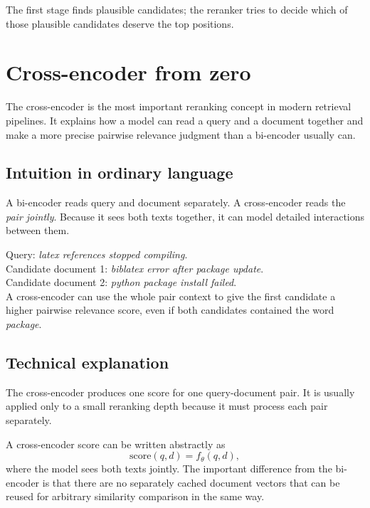 \documentclass[11pt,oneside]{report}
\begin{document}
\begin{rememberbox}
The first stage finds plausible candidates; the reranker tries to decide which of those plausible candidates deserve the top positions.
\end{rememberbox}


\chapter[Cross-Encoder]{Cross-encoder from zero}

\begin{purposebox}
The cross-encoder is the most important reranking concept in modern retrieval pipelines. It explains how a model can read a query and a document together and make a more precise pairwise relevance judgment than a bi-encoder usually can.
\end{purposebox}

\section*{Intuition in ordinary language}
A bi-encoder reads query and document separately. A cross-encoder reads the \emph{pair jointly}. Because it sees both texts together, it can model detailed interactions between them.

\begin{examplebox}
Query: \emph{latex references stopped compiling}.\\
Candidate document 1: \emph{biblatex error after package update}.\\
Candidate document 2: \emph{python package install failed}.\\
A cross-encoder can use the whole pair context to give the first candidate a higher pairwise relevance score, even if both candidates contained the word \emph{package}.
\end{examplebox}

\section*{Technical explanation}
The cross-encoder produces one score for one query-document pair. It is usually applied only to a small reranking depth because it must process each pair separately.

\begin{formulabox}
A cross-encoder score can be written abstractly as
\[
\mathrm{score}(q,d)=f_\theta(q,d),
\]
where the model sees both texts jointly. The important difference from the bi-encoder is that there are no separately cached document vectors that can be reused for arbitrary similarity comparison in the same way.
\end{formulabox}
\end{document}
